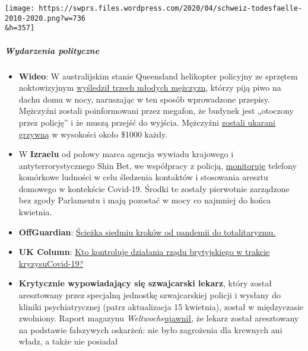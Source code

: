 \texttt{[image: https://swprs.files.wordpress.com/2020/04/schweiz-todesfaelle-2010-2020.png?w=736\\\&h=357]}

\hypertarget{wydarzenia-polityczne}{%
\subparagraph{\texorpdfstring{\textbf{Wydarzenia
polityczne}}{Wydarzenia polityczne}}\label{wydarzenia-polityczne}}

\begin{itemize}
\tightlist
\item
  \textbf{Wideo}: W australijskim stanie Queensland helikopter policyjny
  ze sprzętem noktowizyjnym
  \href{https://twitter.com/Independent/status/1252911273597120513}{wyśledził
  trzech młodych mężczyzn}, którzy piją piwo na dachu domu w nocy,
  naruszając w ten sposób wprowadzone przepisy. Mężczyźni zostali
  poinformowani przez megafon, że budynek jest „otoczony przez policję''
  i że muszą przejść do wyjścia. Mężczyźni
  \href{https://www.dailystar.co.uk/news/world-news/police-helicopter-uses-night-vision-21899640}{zostali
  ukarani grzywną} w wysokości około \$1000 każdy.
\item
  W \textbf{Izraelu} od połowy marca agencja wywiadu krajowego i
  antyterrorystycznego Shin Bet, we współpracy z policją,
  \href{https://www.jewishpress.com/news/the-courts/state-to-high-court-even-more-shin-bet-involvement-in-fighting-the-coronavirus/2020/04/14/}{monitoruje}
  telefony komórkowe ludności w celu śledzenia kontaktów i stosowania
  aresztu domowego w kontekście Covid-19. Środki te zostały pierwotnie
  zarządzone bez zgody Parlamentu i mają pozostać w mocy co najmniej do
  końca kwietnia.
\item
  \textbf{OffGuardian}:
  \href{https://off-guardian.org/2020/04/23/the-seven-step-path-from-pandemic-to-totalitarianism/}{Ścieżka
  siedmiu kroków od pandemii do totalitaryzmu.}
\item
  \textbf{UK Column}:
  \href{https://www.ukcolumn.org/article/who-controls-british-government-response-covid19-part-one}{Kto
  kontroluje działania rządu brytyjskiego w trakcie kryzysuCovid-19?}
\item
  \textbf{Krytycznie wypowiadający się szwajcarski lekarz}, który został
  aresztowany przez specjalną jednostkę szwajcarskiej policji i wysłany
  do kliniki psychiatrycznej (patrz aktualizacja 15 kwietnia), został w
  międzyczasie zwolniony. Raport magazynu
  \emph{Weltwoche}\href{https://uncut-news.ch/wp-content/uploads/2020/04/Wer-l\%C3\%B6ste-den-Fehlalarm-aus.pdf}{ujawnił},
  że lekarz został aresztowany na podstawie fałszywych oskarżeń: nie
  było zagrożenia dla krewnych ani władz, a także nie posiadał

\end{itemize}
